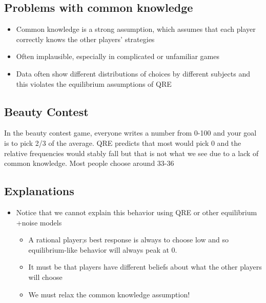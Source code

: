 \subsection{Problems with common knowledge}
\begin{itemize}
    \item Common knowledge is a strong assumption, which assumes that each player correctly knows the other players' strategies
    \item Often implausible, especially in complicated or unfamiliar games
    \item Data often show different distributions of choices by different subjects and this violates the equilibrium assumptions of QRE
\end{itemize}

\subsection{Beauty Contest}
In the beauty contest game, everyone writes a number from 0-100 and your goal is to pick 2/3 of the average. QRE predicts that most would pick 0 and the relative frequencies would stably fall but that is not what we see due to a lack of common knowledge. Most people choose around 33-36
\subsection{Explanations}
\begin{itemize}
    \item Notice that we cannot explain this behavior using QRE or other equilibrium 
+noise models 
\begin{itemize}
    \item A rational player;s best response is always to choose low and so equilibrium-like behavior will always peak at 0.
    \item It must be that players have different beliefs about what the other players will choose
    \item We must relax the common knowledge assumption!
\end{itemize}
\end{itemize}

